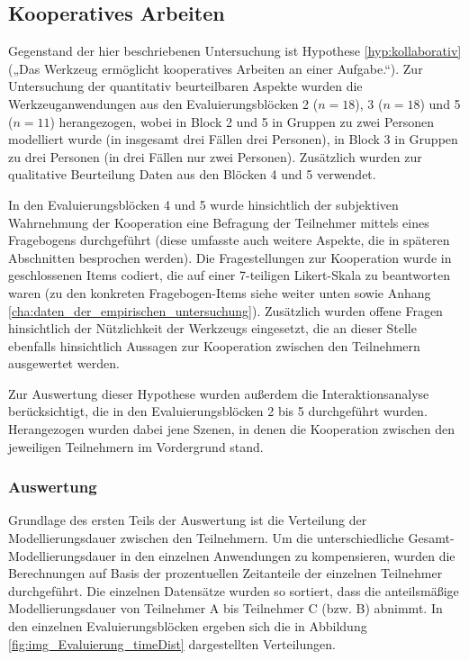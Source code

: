 
\subsection{Kooperatives Arbeiten} %
\label{sub:kollaboratives_arbeiten}

Gegenstand der hier beschriebenen Untersuchung ist Hypothese \ref{hyp:kollaborativ} („Das Werkzeug ermöglicht kooperatives Arbeiten an einer Aufgabe.“). Zur Untersuchung der quantitativ beurteilbaren Aspekte wurden die Werkzeuganwendungen aus den Evaluierungsblöcken 2 ($n=18$), 3 ($n=18$) und 5 ($n=11$) herangezogen, wobei in Block 2 und 5 in Gruppen zu zwei Personen modelliert wurde (in insgesamt drei Fällen drei Personen), in Block 3 in Gruppen zu drei Personen (in drei Fällen nur zwei Personen). Zusätzlich wurden zur qualitative Beurteilung Daten aus den Blöcken 4 und 5 verwendet.

In den Evaluierungsblöcken 4 und 5 wurde hinsichtlich der subjektiven Wahrnehmung der Kooperation eine Befragung der Teilnehmer mittels eines Fragebogens durchgeführt (diese umfasste auch weitere Aspekte, die in späteren Abschnitten besprochen werden). Die Fragestellungen zur Kooperation wurde in geschlossenen Items codiert, die auf einer 7-teiligen Likert-Skala zu beantworten waren (zu den konkreten Fragebogen-Items siehe weiter unten sowie Anhang \ref{cha:daten_der_empirischen_untersuchung}). Zusätzlich wurden offene Fragen hinsichtlich der Nützlichkeit der Werkzeugs eingesetzt, die an dieser Stelle ebenfalls hinsichtlich Aussagen zur Kooperation zwischen den Teilnehmern ausgewertet werden. 

Zur Auswertung dieser Hypothese wurden außerdem die Interaktionsanalyse berücksichtigt, die in den Evaluierungsblöcken 2 bis 5 durchgeführt wurden. Herangezogen wurden dabei jene Szenen, in denen die Kooperation zwischen den jeweiligen Teilnehmern im Vordergrund stand.

\subsubsection{Auswertung} %

Grundlage des ersten Teils der Auswertung ist die Verteilung der Modellierungsdauer zwischen den Teilnehmern. Um die unterschiedliche Gesamt-Modellierungsdauer in den einzelnen Anwendungen zu kompensieren, wurden die Berechnungen auf Basis der prozentuellen Zeitanteile der einzelnen Teilnehmer durchgeführt. Die einzelnen Datensätze wurden so sortiert, dass die anteilsmäßige Modellierungsdauer von Teilnehmer A bis Teilnehmer C (bzw. B) abnimmt. In den einzelnen Evaluierungsblöcken ergeben sich die in Abbildung \ref{fig:img_Evaluierung_timeDist} dargestellten Verteilungen.

